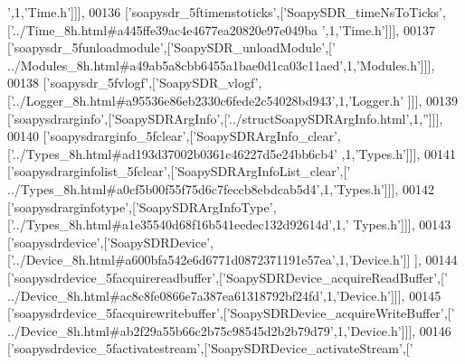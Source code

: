 \begin{DoxyCode}
{      '},1,\textcolor{stringliteral}{'Time.h'}]]],
00136   [\textcolor{stringliteral}{'soapysdr\_5ftimenstoticks'},[\textcolor{stringliteral}{'SoapySDR\_timeNsToTicks'},[\textcolor{stringliteral}{'../Time\_8h.html#a445ffe39ac4e4677ea20820e97e049ba
      '},1,\textcolor{stringliteral}{'Time.h'}]]],
00137   [\textcolor{stringliteral}{'soapysdr\_5funloadmodule'},[\textcolor{stringliteral}{'SoapySDR\_unloadModule'},[\textcolor{stringliteral}{'
      ../Modules\_8h.html#a49ab5a8cbb6455a1bae0d1ca03c11aed'},1,\textcolor{stringliteral}{'Modules.h'}]]],
00138   [\textcolor{stringliteral}{'soapysdr\_5fvlogf'},[\textcolor{stringliteral}{'SoapySDR\_vlogf'},[\textcolor{stringliteral}{'../Logger\_8h.html#a95536e86eb2330c6fede2c54028bd943'},1,\textcolor{stringliteral}{'Logger.h'}
      ]]],
00139   [\textcolor{stringliteral}{'soapysdrarginfo'},[\textcolor{stringliteral}{'SoapySDRArgInfo'},[\textcolor{stringliteral}{'../structSoapySDRArgInfo.html'},1,\textcolor{stringliteral}{''}]]],
00140   [\textcolor{stringliteral}{'soapysdrarginfo\_5fclear'},[\textcolor{stringliteral}{'SoapySDRArgInfo\_clear'},[\textcolor{stringliteral}{'../Types\_8h.html#ad193d37002b0361c46227d5e24bb6cb4'}
      ,1,\textcolor{stringliteral}{'Types.h'}]]],
00141   [\textcolor{stringliteral}{'soapysdrarginfolist\_5fclear'},[\textcolor{stringliteral}{'SoapySDRArgInfoList\_clear'},[\textcolor{stringliteral}{'
      ../Types\_8h.html#a0cf5b00f55f75d6c7feccb8ebdcab5d4'},1,\textcolor{stringliteral}{'Types.h'}]]],
00142   [\textcolor{stringliteral}{'soapysdrarginfotype'},[\textcolor{stringliteral}{'SoapySDRArgInfoType'},[\textcolor{stringliteral}{'../Types\_8h.html#a1e35540d68f16b541eedec132d92614d'},1,\textcolor{stringliteral}{'
      Types.h'}]]],
00143   [\textcolor{stringliteral}{'soapysdrdevice'},[\textcolor{stringliteral}{'SoapySDRDevice'},[\textcolor{stringliteral}{'../Device\_8h.html#a600bfa542e6d6771d0872371191e57ea'},1,\textcolor{stringliteral}{'Device.h'}]]
      ],
00144   [\textcolor{stringliteral}{'soapysdrdevice\_5facquirereadbuffer'},[\textcolor{stringliteral}{'SoapySDRDevice\_acquireReadBuffer'},[\textcolor{stringliteral}{'
      ../Device\_8h.html#ac8c8fe0866e7a387ea61318792bf24fd'},1,\textcolor{stringliteral}{'Device.h'}]]],
00145   [\textcolor{stringliteral}{'soapysdrdevice\_5facquirewritebuffer'},[\textcolor{stringliteral}{'SoapySDRDevice\_acquireWriteBuffer'},[\textcolor{stringliteral}{'
      ../Device\_8h.html#ab2f29a55b66c2b75c98545d2b2b79d79'},1,\textcolor{stringliteral}{'Device.h'}]]],
00146   [\textcolor{stringliteral}{'soapysdrdevice\_5factivatestream'},[\textcolor{stringliteral}{'SoapySDRDevice\_activateStream'},[\textcolor{stringliteral}{'
}
\end{DoxyCode}
